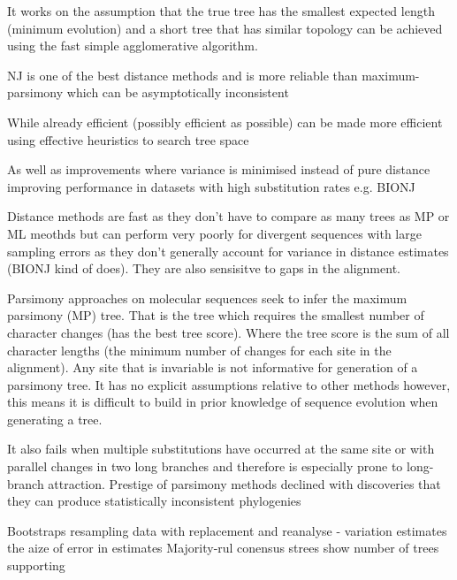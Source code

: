 It works on the assumption that the true tree has the smallest expected length (minimum evolution) and a short tree
that has similar topology can be achieved using the fast simple agglomerative algorithm.


NJ is one of the best distance methods and is more reliable than maximum-parsimony which can be asymptotically inconsistent

While already efficient (possibly efficient as possible) can be made more efficient using effective heuristics
to search tree space \citep{Kumar1996}

As well as improvements where variance is minimised instead of pure distance improving performance in datasets with high
substitution rates e.g. BIONJ \citep{Gascuel1997}



Distance methods are fast as they don't have to compare as many trees as MP or ML meothds \citep{} but can perform
very poorly for divergent sequences with large sampling errors as they don't generally account for variance in 
distance estimates \citep{Yang2012} (BIONJ kind of does).
They are also sensisitve to gaps in the alignment.





Parsimony approaches \citep{Camin1965} on molecular sequences \citep{eck1966atlas} seek to infer the maximum parsimony (MP) tree.
That is the tree which requires the smallest number of character changes (has the best tree score).  Where the tree score is the sum of 
all character lengths (the minimum number of changes for each site in the alignment).  Any site that is invariable is not
informative for generation of a parsimony tree.
It has no explicit assumptions relative to other methods however, this means it is difficult to build in 
prior knowledge of sequence evolution when generating a tree.

It also fails when multiple substitutions have occurred at the same site or with parallel changes in two long branches 
and therefore is especially prone to long-branch attraction.
\citep{Felsenstein1978}
Prestige of parsimony methods declined with discoveries that they can produce statistically inconsistent
phylogenies \citep{Felsenstein2001}






Bootstraps resampling data with replacement and reanalyse - variation estimates the aize of error in estimates \citep{Felsenstein1985}
Majority-rul conensus strees show number of trees supporting 





